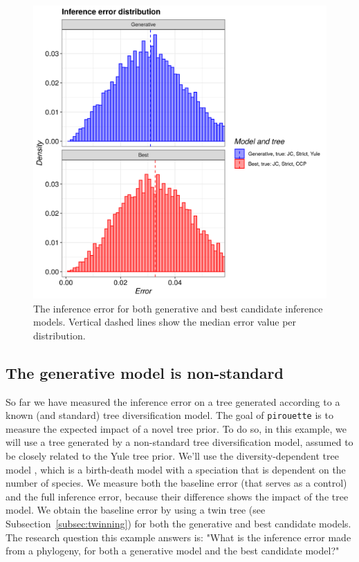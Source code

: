 \begin{figure}[H]
  \includegraphics[width=\textwidth]{pirouette_example_2/example_2_314/errors.png}
  \caption{
    The inference error for both generative and best candidate inference models.
    Vertical dashed lines show the median error value per distribution.
  }
  \label{fig:example_2}
\end{figure}

\subsection{The generative model is non-standard}\label{Comparing to background noise}

So far we have measured the inference error on a tree
generated according to a known (and standard) tree diversification model. 
The goal of \verb;pirouette; is to measure the expected impact of a novel tree prior.
To do so, in this example, we will use a tree generated by a non-standard 
tree diversification model, assumed to be closely related to the Yule tree prior.
We'll use the diversity-dependent tree model \cite{etienne2011diversity},
which is a birth-death model with a speciation that is dependent on the
number of species.
We measure both the baseline 
error (that serves as a control) and the full inference error, because their 
difference shows the impact of the tree model.
We obtain the baseline error by using a twin tree (see Subsection~\ref{subsec:twinning}) for 
both the generative and best candidate models.
The research question this example answers is:
"What is the inference error made from a phylogeny, 
for both a generative model and the best candidate model?"

